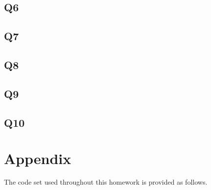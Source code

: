 \documentclass{assignment}
\begin{document}
\subsection{Q6}

\subsection{Q7}

\subsection{Q8}

\subsection{Q9}

\subsection{Q10}

\section*{Appendix}
The code set used throughout this homework is provided as follows. 

% 



\nocite{*} 
\end{document}
